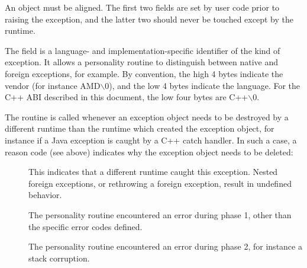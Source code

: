 

An  object must be \eightbyte aligned.  The first
two fields are set by user code prior to raising the exception, and the
latter two should never be touched except by the runtime.

The  field is a language- and implementation-specific
identifier of the kind of exception. It allows a personality routine
to distinguish between native and foreign exceptions, for example.
By convention, the high 4 bytes indicate the vendor (for instance
AMD$\backslash$0), and the low 4 bytes indicate the language.  For the C++
ABI described in this document, the low four bytes are C++$\backslash$0.

The  routine is called whenever an exception object
needs to be destroyed by a different runtime than the runtime
which created the exception object, for instance if a Java exception
is caught by a C++ catch handler. In such a case, a reason code (see
above) indicates why the exception object needs to be deleted:

\begin{description}
\item[] This indicates that a
     different runtime caught this exception. Nested foreign exceptions,
     or rethrowing a foreign exception, result in undefined behavior.

\item[] The personality routine encountered
     an error during phase 1, other than the specific error codes defined.

\item[] The personality routine
  encountered an error during phase 2, for instance a stack corruption.
\end{description}

